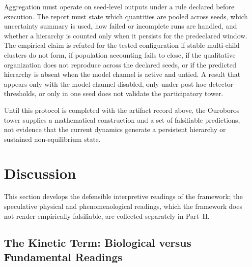 \documentclass[11pt]{article}
\begin{document}
Aggregation must operate on seed-level outputs under a rule declared before execution. The report must state which quantities are pooled across seeds, which uncertainty summary is used, how failed or incomplete runs are handled, and whether a hierarchy is counted only when it persists for the predeclared window. The empirical claim is refuted for the tested configuration if stable multi-child clusters do not form, if population accounting fails to close, if the qualitative organization does not reproduce across the declared seeds, or if the predicted hierarchy is absent when the model channel is active and untied. A result that appears only with the model channel disabled, only under post hoc detector thresholds, or only in one seed does not validate the participatory tower.

Until this protocol is completed with the artifact record above, the Ouroboros tower supplies a mathematical construction and a set of falsifiable predictions, not evidence that the current dynamics generate a persistent hierarchy or sustained non-equilibrium state.


\section{Discussion}\label{sec:discussion}

This section develops the defensible interpretive readings of the framework; the speculative physical and phenomenological readings, which the framework does not render empirically falsifiable, are collected separately in Part~II.

\subsection{The Kinetic Term: Biological versus Fundamental Readings}
\end{document}

